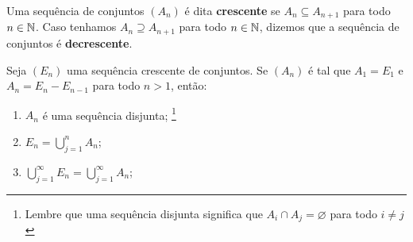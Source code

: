 \begin{definition}
\label{def:sequência-crescente-decrescente-de-conjuntos}
    Uma sequência de conjuntos $(A_n)$ é dita \textbf{crescente} se $A_n \subseteq A_{n+1}$ para todo $n \in \operatorname{\mathbb{N}}$.
    Caso tenhamos $A_n \supseteq A_{n+1}$ para todo $n \in \operatorname{\mathbb{N}}$, dizemos que a sequência  de conjuntos é \textbf{decrescente}.
\end{definition}

\begin{proposition}
\label{prop:sequencia-crescente-conjuntos-resultado-A_n}
Seja $(E_n)$ uma sequência crescente de conjuntos. Se $(A_n)$ é tal que $A_1 = E_1$ e $A_n = E_n - E_{n -1}$ para todo $n > 1$, então:
\begin{enumerate}[label* = (\roman*)]
    \item $A_n$ é uma sequência disjunta;
        \footnote{Lembre que uma sequência disjunta significa que $A_i \cap A_j = \varnothing$ para todo $i \neq j$}
    \item $E_n = \displaystyle \bigcup_{j = 1}^n A_n$;
    \item $\displaystyle \bigcup_{j = 1}^\infty E_n = \displaystyle \bigcup_{j = 1}^\infty A_n$;
\end{enumerate}
\end{proposition}

